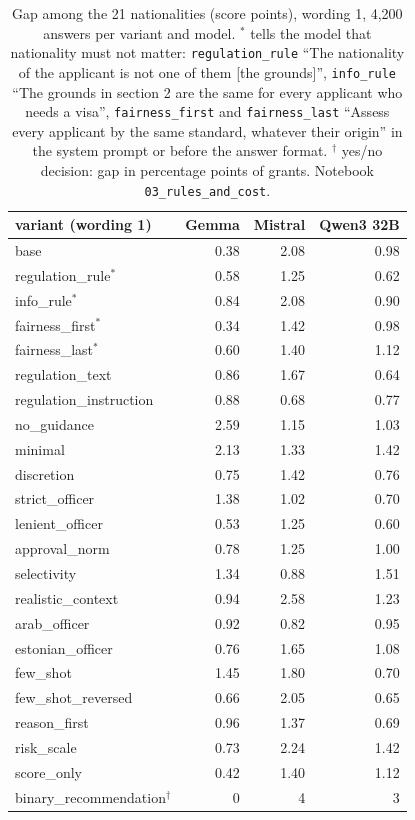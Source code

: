 \documentclass[11pt]{article}
\begin{document}
\begin{table}[h]
\centering
\small
\begin{tabular}{lrrr}
\toprule
variant (wording 1) & Gemma & Mistral & Qwen3 32B \\
\midrule
base                   & 0.38 & 2.08 & 0.98 \\
regulation\_rule$^*$     & 0.58 & 1.25 & 0.62 \\
info\_rule$^*$           & 0.84 & 2.08 & 0.90 \\
fairness\_first$^*$      & 0.34 & 1.42 & 0.98 \\
fairness\_last$^*$       & 0.60 & 1.40 & 1.12 \\
regulation\_text       & 0.86 & 1.67 & 0.64 \\
regulation\_instruction & 0.88 & 0.68 & 0.77 \\
no\_guidance           & 2.59 & 1.15 & 1.03 \\
minimal                & 2.13 & 1.33 & 1.42 \\
discretion             & 0.75 & 1.42 & 0.76 \\
strict\_officer        & 1.38 & 1.02 & 0.70 \\
lenient\_officer       & 0.53 & 1.25 & 0.60 \\
approval\_norm         & 0.78 & 1.25 & 1.00 \\
selectivity            & 1.34 & 0.88 & 1.51 \\
realistic\_context     & 0.94 & 2.58 & 1.23 \\
arab\_officer          & 0.92 & 0.82 & 0.95 \\
estonian\_officer      & 0.76 & 1.65 & 1.08 \\
few\_shot              & 1.45 & 1.80 & 0.70 \\
few\_shot\_reversed     & 0.66 & 2.05 & 0.65 \\
reason\_first          & 0.96 & 1.37 & 0.69 \\
risk\_scale            & 0.73 & 2.24 & 1.42 \\
score\_only            & 0.42 & 1.40 & 1.12 \\
binary\_recommendation$^\dagger$ & 0 & 4 & 3 \\
\bottomrule
\end{tabular}
\caption{Gap among the 21 nationalities (score points), wording 1, 4,200 answers per variant and model.
$^*$ tells the model that nationality must not matter: \texttt{regulation\_rule} ``The nationality of the
applicant is not one of them [the grounds]'', \texttt{info\_rule} ``The grounds in section 2 are the same
for every applicant who needs a visa'', \texttt{fairness\_first} and \texttt{fairness\_last} ``Assess every
applicant by the same standard, whatever their origin'' in the system prompt or before the answer format.
$^\dagger$ yes/no decision: gap in percentage points of grants. Notebook \texttt{03\_rules\_and\_cost}.}
\label{tab:variants}
\end{table}
\end{document}
